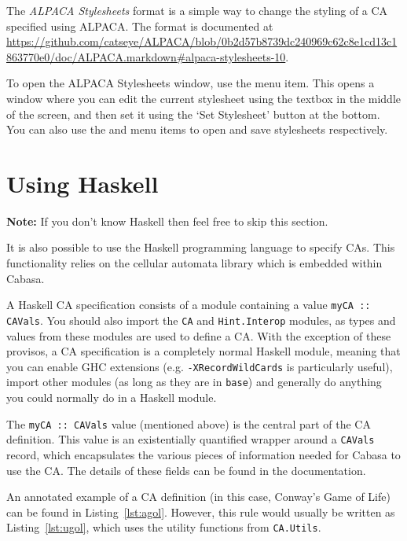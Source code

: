 \documentclass[oneside,a4paper]{memoir}
\begin{document}
The \emph{ALPACA Stylesheets} format is a simple way to change the styling of a CA specified using ALPACA.
The format is documented at \url{https://github.com/catseye/ALPACA/blob/0b2d57b8739dc240969c62c8e1cd13c1863770e0/doc/ALPACA.markdown#alpaca-stylesheets-10}.

To open the ALPACA Stylesheets window, use the  menu item.
This opens a window where you can edit the current stylesheet using the textbox in the middle of the screen,
  and then set it using the `Set Stylesheet' button at the bottom.
You can also use the  and  menu items to open and save stylesheets respectively.

\section{Using Haskell}
\label{sec:ushs}

\textbf{Note:} If you don't know Haskell then feel free to skip this section.

\vspace{2ex}

\noindent It is also possible to use the Haskell programming language to specify CAs.
This functionality relies on the cellular automata library which is embedded within Cabasa.

A Haskell CA specification consists of a module containing a value \texttt{myCA :: CAVals}.
You should also import the \texttt{CA} and \texttt{Hint.Interop} modules,
  as types and values from these modules are used to define a CA.
With the exception of these provisos, a CA specification is a completely normal Haskell module,
  meaning that you can enable GHC extensions (e.g. \texttt{-XRecordWildCards} is particularly useful),
  import other modules (as long as they are in \texttt{base})
  and generally do anything you could normally do in a Haskell module.

The \texttt{myCA :: CAVals} value (mentioned above) is the central part of the CA definition.
This value is an existentially quantified wrapper around a \texttt{CAVals\textquotesingle} record,
  which encapsulates the various pieces of information needed for Cabasa to use the CA.
The details of these fields can be found in the documentation.

An annotated example of a CA definition (in this case, Conway's Game of Life) can be found in Listing~\ref{lst:agol}.
However, this rule would usually be written as Listing~\ref{lst:ugol},
  which uses the utility functions from \texttt{CA.Utils}.
\end{document}
